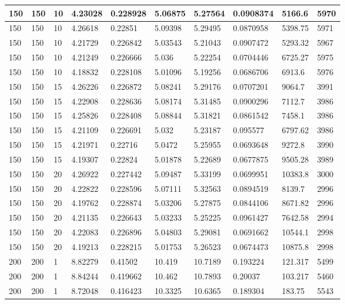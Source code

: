 \begin{landscape}
\begin{longtable}{ | l | l | l | l | l | l | l | l | l | l | }
150 & 150 & 10 & 4.23028 & 0.228928 & 5.06875 & 5.27564 & 0.0908374 & 5166.6 & 5970\\ \hline
150 & 150 & 10 & 4.26618 & 0.22851 & 5.09398 & 5.29495 & 0.0870958 & 5398.75 & 5971\\ \hline
150 & 150 & 10 & 4.21729 & 0.226842 & 5.03543 & 5.21043 & 0.0907472 & 5293.32 & 5967\\ \hline
150 & 150 & 10 & 4.21249 & 0.226666 & 5.036 & 5.22254 & 0.0704446 & 6725.27 & 5975\\ \hline
150 & 150 & 10 & 4.18832 & 0.228108 & 5.01096 & 5.19256 & 0.0686706 & 6913.6 & 5976\\ \hline
150 & 150 & 15 & 4.26226 & 0.226872 & 5.08241 & 5.29176 & 0.0707201 & 9064.7 & 3991\\ \hline
150 & 150 & 15 & 4.22908 & 0.228636 & 5.08174 & 5.31485 & 0.0900296 & 7112.7 & 3986\\ \hline
150 & 150 & 15 & 4.25826 & 0.228408 & 5.08844 & 5.31821 & 0.0861542 & 7458.1 & 3986\\ \hline
150 & 150 & 15 & 4.21109 & 0.226691 & 5.032 & 5.23187 & 0.095577 & 6797.62 & 3986\\ \hline
150 & 150 & 15 & 4.21971 & 0.22716 & 5.0472 & 5.25955 & 0.0693648 & 9272.8 & 3990\\ \hline
150 & 150 & 15 & 4.19307 & 0.22824 & 5.01878 & 5.22689 & 0.0677875 & 9505.28 & 3989\\ \hline
150 & 150 & 20 & 4.26922 & 0.227442 & 5.09487 & 5.33199 & 0.0699951 & 10383.8 & 3000\\ \hline
150 & 150 & 20 & 4.22822 & 0.228596 & 5.07111 & 5.32563 & 0.0894519 & 8139.7 & 2996\\ \hline
150 & 150 & 20 & 4.19762 & 0.228874 & 5.03206 & 5.27875 & 0.0844106 & 8671.82 & 2996\\ \hline
150 & 150 & 20 & 4.21135 & 0.226643 & 5.03233 & 5.25225 & 0.0961427 & 7642.58 & 2994\\ \hline
150 & 150 & 20 & 4.22083 & 0.226896 & 5.04803 & 5.29081 & 0.0691662 & 10544.1 & 2998\\ \hline
150 & 150 & 20 & 4.19213 & 0.228215 & 5.01753 & 5.26523 & 0.0674473 & 10875.8 & 2998\\ \hline
200 & 200 & 1 & 8.82279 & 0.41502 & 10.419 & 10.7189 & 0.193224 & 121.317 & 5499\\ \hline
200 & 200 & 1 & 8.84244 & 0.419662 & 10.462 & 10.7893 & 0.20037 & 103.217 & 5460\\ \hline
200 & 200 & 1 & 8.72048 & 0.416423 & 10.3325 & 10.6365 & 0.189304 & 183.75 & 5543\\ \hline

\end{longtable}
\end{landscape}
